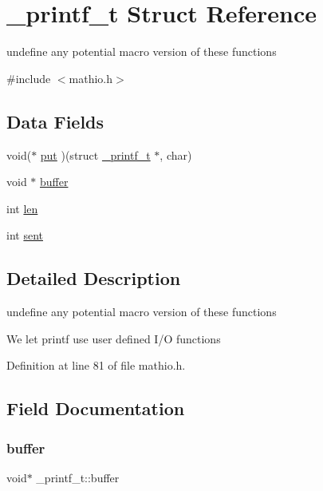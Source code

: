 \hypertarget{struct__printf__t}{}\section{\+\_\+printf\+\_\+t Struct Reference}
\label{struct__printf__t}


undefine any potential macro version of these functions  




{\ttfamily \#include $<$mathio.\+h$>$}

\subsection*{Data Fields}
\begin{DoxyCompactItemize}
\item 
void($\ast$ \hyperlink{struct__printf__t_a3ef8eb0143b93d4446b04c6ce9313be7}{put} )(struct \hyperlink{struct__printf__t}{\+\_\+printf\+\_\+t} $\ast$, char)
\item 
void $\ast$ \hyperlink{struct__printf__t_ad35884151d0be6667caafad8caacc76f}{buffer}
\item 
int \hyperlink{struct__printf__t_a5139902cde74159b79e6418a34712bee}{len}
\item 
int \hyperlink{struct__printf__t_a872716fd701166cd57bd3fffb7b77706}{sent}
\end{DoxyCompactItemize}


\subsection{Detailed Description}
undefine any potential macro version of these functions 

We let printf use user defined I/O functions 

Definition at line 81 of file mathio.\+h.



\subsection{Field Documentation}
\mbox{\label{struct__printf__t_ad35884151d0be6667caafad8caacc76f}} 
\subsubsection{\texorpdfstring{buffer}{buffer}}
{\footnotesize\ttfamily void$\ast$ \+\_\+printf\+\_\+t\+::buffer}



